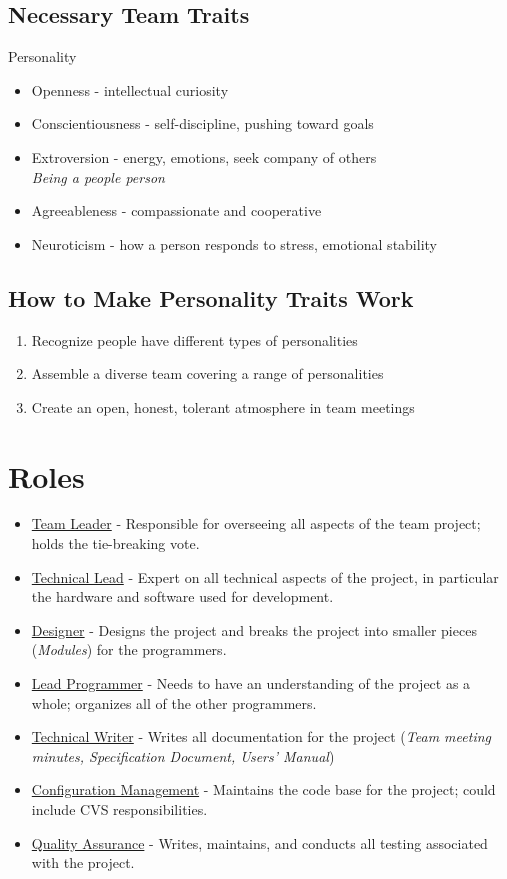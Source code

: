 \documentclass{report}
\begin{document}
			\subsection{Necessary Team Traits}
				Personality
				\begin{itemize}
					\item Openness - intellectual curiosity
					\item Conscientiousness - self-discipline, pushing toward goals
					\item Extroversion - energy, emotions, seek company of others\\
						\textit{Being a people person}
					\item Agreeableness - compassionate and cooperative
					\item Neuroticism - how a person responds to stress, emotional stability
				\end{itemize}
			\subsection{How to Make Personality Traits Work}
				\begin{enumerate}
					\item Recognize people have different types of personalities
					\item Assemble a diverse team covering a range of personalities
					\item Create an open, honest, tolerant atmosphere in team meetings
				\end{enumerate}
		\section{Roles}
			\begin{itemize}
				\item \underline{Team Leader} - Responsible for overseeing all aspects of the team project; holds the tie-breaking vote.
				\item \underline{Technical Lead} - Expert on all technical aspects of the project, in particular the hardware and software used for development.
				\item \underline{Designer} - Designs the project and breaks the project into smaller pieces (\textit{Modules}) for the programmers.
				\item \underline{Lead Programmer} - Needs to have an understanding of the project as a whole; organizes all of the other programmers.
				\item \underline{Technical Writer} - Writes all documentation for the project (\textit{Team meeting minutes, Specification Document, Users' Manual})
				\item \underline{Configuration Management} - Maintains the code base for the project; could include CVS responsibilities.
				\item \underline{Quality Assurance} - Writes, maintains, and conducts all testing associated with the project.
			\end{itemize}
\end{document}
